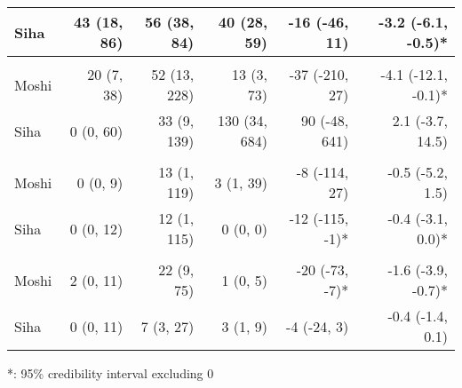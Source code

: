 \begin{table}[t]
\begin{tabular*}{\linewidth}{@{\extracolsep{\fill}}l|rrrrr}
Siha & 43 (18, 86) & 56 (38, 84) & 40 (28, 59) & -16 (-46, 11)  & -3.2 (-6.1, -0.5)* \\ 
\midrule\addlinespace[2.5pt]
\multicolumn{6}{l}{Typhoid} \\[2.5pt] 
\midrule\addlinespace[2.5pt]
Moshi & 20 (7, 38) & 52 (13, 228) & 13 (3, 73) & -37 (-210, 27)  & -4.1 (-12.1, -0.1)* \\ 
Siha & 0 (0, 60) & 33 (9, 139) & 130 (34, 684) & 90 (-48, 641)  & 2.1 (-3.7, 14.5)  \\ 
\midrule\addlinespace[2.5pt]
\multicolumn{6}{l}{Leprosy} \\[2.5pt] 
\midrule\addlinespace[2.5pt]
Moshi & 0 (0, 9) & 13 (1, 119) & 3 (1, 39) & -8 (-114, 27)  & -0.5 (-5.2, 1.5)  \\ 
Siha & 0 (0, 12) & 12 (1, 115) & 0 (0, 0) & -12 (-115, -1)* & -0.4 (-3.1, 0.0)* \\ 
\midrule\addlinespace[2.5pt]
\multicolumn{6}{l}{Schistosomiasis} \\[2.5pt] 
\midrule\addlinespace[2.5pt]
Moshi & 2 (0, 11) & 22 (9, 75) & 1 (0, 5) & -20 (-73, -7)* & -1.6 (-3.9, -0.7)* \\ 
Siha & 0 (0, 11) & 7 (3, 27) & 3 (1, 9) & -4 (-24, 3)  & -0.4 (-1.4, 0.1)  \\ 
\bottomrule
\end{tabular*}
\begin{minipage}{\linewidth}
*: 95\% credibility interval excluding 0\\
\end{minipage}
\end{table}


